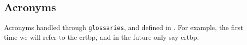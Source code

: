 \subsection{Acronyms}
Acronyms handled through \verb|glossaries|, and defined in . For example, the first time we will refer to the \gls{crtbp}, and in the future only say \gls{crtbp}.
